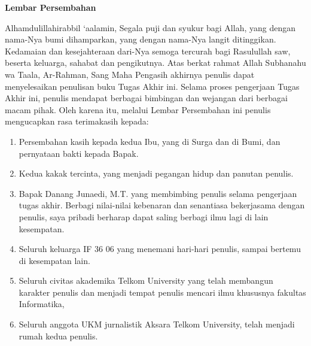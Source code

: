 {\centering
	\textbf{\large Lembar Persembahan}\\
	\vspace{1cm}
}

Alhamdulillahirabbil ‘aalamin, Segala puji dan syukur bagi Allah, yang dengan nama-Nya bumi dihamparkan, yang dengan nama-Nya langit ditinggikan.  Kedamaian dan kesejahteraan dari-Nya semoga tercurah bagi Rasulullah saw, beserta keluarga, sahabat dan pengikutnya. Atas berkat rahmat Allah Subhanahu wa Taala, Ar-Rahman, Sang Maha Pengasih akhirnya penulis dapat menyelesaikan penulisan buku Tugas Akhir ini. Selama proses pengerjaan Tugas Akhir ini, penulis mendapat berbagai bimbingan dan wejangan dari berbagai macam pihak. Oleh karena itu, melalui Lembar Persembahan ini penulis mengucapkan rasa terimakasih kepada:

\begin{enumerate}
	\item Persembahan kasih kepada kedua Ibu, yang di Surga dan di Bumi, dan pernyataan bakti kepada Bapak.
	\item Kedua kakak tercinta, yang menjadi pegangan hidup dan panutan penulis.
	\item Bapak Danang Junaedi, M.T. yang membimbing penulis selama pengerjaan tugas akhir. Berbagi nilai-nilai kebenaran dan senantiasa bekerjasama dengan penulis, saya pribadi berharap dapat saling berbagi ilmu lagi di lain kesempatan.
	\item Seluruh keluarga IF 36 06 yang menemani hari-hari penulis, sampai bertemu di kesempatan lain.
	\item Seluruh civitas akademika Telkom University yang telah membangun karakter penulis dan menjadi tempat penulis mencari ilmu khususnya fakultas Informatika, 
	\item Seluruh anggota UKM jurnalistik Aksara Telkom University, telah menjadi rumah kedua penulis.
\end{enumerate}

